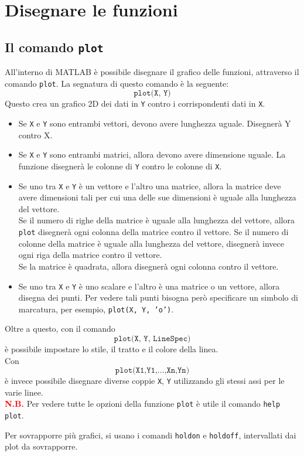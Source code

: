 \chapter{Disegnare le funzioni}
\section{Il comando \texttt{plot}}
All'interno di MATLAB è possibile disegnare il grafico delle funzioni, attraverso il comando \texttt{plot}.
La segnatura di questo comando è la seguente:
$$ \texttt{plot(X, Y)} $$
Questo crea un grafico 2D dei dati in \texttt{Y} contro i corrispondenti dati in \texttt{X}.
\begin{itemize}
	\item 	Se \texttt{X} e \texttt{Y} sono entrambi vettori, devono avere lunghezza uguale. Disegnerà Y contro X.
	\item	Se \texttt{X} e \texttt{Y} sono entrambi matrici, allora devono avere dimensione uguale. La funzione
			disegnerà le colonne di \texttt{Y} contro le colonne di \texttt{X}.
	\item	Se uno tra \texttt{X} e \texttt{Y} è un vettore e l'altro una matrice, allora la matrice deve avere
			dimensioni tali per cui una delle sue dimensioni è uguale alla lunghezza del vettore. \\
			Se il numero di righe della matrice è uguale alla lunghezza del vettore, allora \texttt{plot} 
			disegnerà ogni colonna della matrice contro il vettore. Se il numero di colonne della matrice è uguale
			alla lunghezza del vettore, disegnerà invece ogni riga della matrice contro il vettore. \\
			Se la matrice è quadrata, allora disegnerà ogni colonna contro il vettore.
	\item	Se uno tra \texttt{X} e \texttt{Y} è uno scalare e l'altro è una matrice o un vettore, allora disegna
			dei punti. Per vedere tali punti bisogna però specificare un simbolo di marcatura, per esempio,
			\texttt{plot(X, Y, 'o')}.
\end{itemize}

Oltre a questo, con il comando $$\texttt{plot(X, Y, LineSpec)}$$ è possibile impostare lo stile, il tratto e il 
colore della linea. \break \\
Con $$\texttt{plot(X1,Y1,...,Xn,Yn)}$$ è invece possibile disegnare diverse coppie \texttt{X}, \texttt{Y} utilizzando 
gli stessi assi per le varie linee. \break \\

\textcolor{Red}{\textbf{N.B.}} Per vedere tutte le opzioni della funzione \texttt{plot} è utile il comando \texttt{help 
plot}.

Per sovrapporre più grafici, si usano i comandi \texttt{holdon} e \texttt{holdoff}, intervallati dai plot da 
sovrapporre.